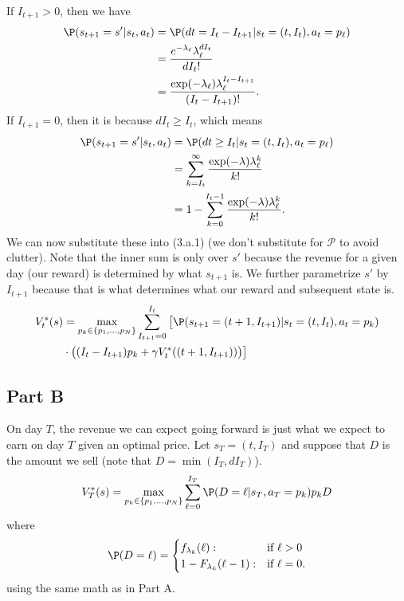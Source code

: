 \documentclass{article}
\begin{document}
\noindent If $I_{t + 1} > 0$, then we have
\begin{align*}
	\P(s_{t + 1} = s'| s_t, a_t) &=\P(dt = I_t - I_{t + 1}| s_t = (t, I_t), a_t = p_\ell)\\
	&= \frac{e^{-\lambda_\ell}\lambda_\ell^{dI_t}}{dI_t!}\\
	&=\frac{\exp(-\lambda_\ell)\lambda_\ell^{I_t - I_{t + 1}}}{(I_t - I_{t + 1})!}.
\end{align*}
If $I_{t + 1} = 0$, then it is because $dI_t \geq I_t$, which means
\begin{align*}
	\P(s_{t + 1} = s'| s_t, a_t) &= \P(dt\geq I_t| s_t = (t, I_t), a_t = p_\ell) \\
	&= \sum_{k = I_t}^\infty \frac{\exp(-\lambda)\lambda_\ell^{k}}{k!}\\
	&=1 - \sum_{k = 0}^{I_t - 1}\frac{\exp(-\lambda)\lambda_\ell^{k}}{k!}.
\end{align*}
We can now substitute these into (3.a.1) (we don't substitute for $\mathcal{P}$ to avoid clutter). Note that the inner sum is only over $s'$ because the revenue for a given day (our reward) is determined by what $s_{t + 1}$ is. We further parametrize $s'$ by $I_{t + 1}$ because that is what determines what our reward and subsequent state is.
\begin{align*}
	V_t^*(s) &= \max_{p_k\in\{p_1, \ldots, p_N\}}\sum_{I_{t + 1} = 0}^{I_t}\big[\P(s_{t + 1} = (t + 1, I_{t+1})| s_t = (t, I_t), a_t = p_k)\\
	&\cdot \big((I_{t} - I_{t + 1})p_k + \gamma V_t^*((t+1, I_{t + 1}))\big)\big]
\end{align*}
\subsection*{Part B}
On day $T$, the revenue we can expect going forward is just what we expect to earn on day $T$ given an optimal price. Let $s_T = (t, I_T)$ and suppose that $D$ is the amount we sell (note that $D = \min(I_T, dI_T)$).
\begin{align*}
	V_T^*(s) = \max_{p_k \in \{p_1,\ldots, p_N\}}\sum_{\ell = 0}^{I_T}\P(D = \ell|s_T, a_T = p_k)p_kD
\end{align*}
where
\begin{align*}
	\P(D = \ell) = \begin{cases}
		f_{\lambda_k}(\ell):&\text{if }\ell > 0\\
		1 - F_{\lambda_k}(\ell - 1):&\text{if }\ell = 0.
	\end{cases}
\end{align*}
using the same math as in Part A.
\end{document}
